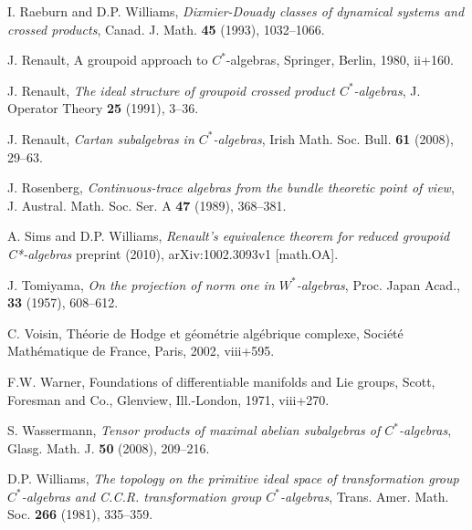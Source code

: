 \documentclass[12pt,a4paper]{amsart}
\begin{document}
\begin{thebibliography}{00}
 I. Raeburn  and D.P. Williams,
    \emph{Dixmier-{D}ouady classes of dynamical systems and
    crossed products}, Canad. J. Math. \textbf{45} (1993),
    1032--1066.


 J. Renault, A groupoid approach to
    {$C^{\ast} $}-algebras, Springer, Berlin, 1980, ii+160.

 J. Renault, \emph{The ideal structure of
    groupoid crossed product {$C^\ast$}-algebras}, J. Operator
    Theory \textbf{25} (1991), 3--36.

 J. Renault, \emph{Cartan subalgebras in
    {$C^\ast$}-algebras},  Irish Math. Soc. Bull.  \textbf{61}
    (2008), 29--63.

 J. Rosenberg, \emph{Continuous-trace algebras from
    the bundle theoretic point of view}, J. Austral. Math. Soc.
    Ser. A \textbf{47} (1989), 368--381.

  A. Sims and D.P. Williams,
    \emph{Renault's equivalence theorem for reduced groupoid
    C*-algebras} preprint (2010), 	arXiv:1002.3093v1
    [math.OA].

 J. Tomiyama, \emph{On the projection of norm one in $W^*$-algebras}, Proc. Japan Acad., \textbf{33} (1957), 608--612.

 C. Voisin, Th\'eorie de {H}odge et
    g\'eom\'etrie alg\'ebrique complexe, Soci\'et\'e
    Math\'ematique de France, Paris, 2002, viii+595.

 F.W. Warner, Foundations of differentiable
    manifolds and {L}ie groups, Scott, Foresman and Co.,
    Glenview, Ill.-London, 1971, viii+270.

 S. Wassermann, \emph{Tensor products of
    maximal abelian subalgebras of {$C^\ast$}-algebras}, Glasg.
    Math. J. \textbf{50} (2008), 209--216.

 D.P. Williams, \emph{The topology on the
    primitive ideal space of transformation group {$C^{\ast}
    $}-algebras and {C}.{C}.{R}. transformation group {$C^{\ast}
    $}-algebras}, Trans. Amer. Math. Soc. \textbf{266} (1981),
    335--359.

\end{thebibliography}
\end{document}
